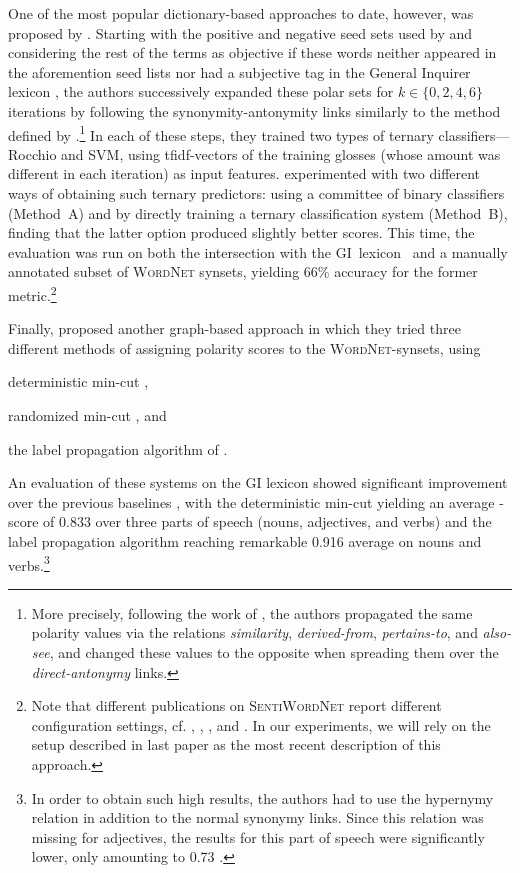 One of the most popular dictionary-based approaches to date, however,
was proposed by \citet{Esuli:06c}.  Starting with the positive and
negative seed sets used by \citet{Turney:03} and considering the rest
of the terms as objective if these words neither appeared in the
aforemention seed lists nor had a subjective tag in the General
Inquirer lexicon \cite{Stone:66}, the authors successively expanded
these polar sets for $k \in \{0, 2, 4, 6\}$ iterations by following
the synonymity-antonymity links similarly to the method defined by
\citet{Hu:04}.\footnote{More precisely, following the work of
  \citet{Strapparava:04}, the authors propagated the same polarity
  values via the relations \emph{similarity}, \emph{derived-from},
  \emph{pertains-to}, and \emph{also-see}, and changed these values to
  the opposite when spreading them over the \emph{direct-antonymy}
  links.}  In each of these steps, they trained two types of ternary
classifiers---Rocchio and SVM, using tfidf-vectors of the training
glosses (whose amount was different in each iteration) as input
features.  \citet{Esuli:06c} experimented with two different ways of
obtaining such ternary predictors: using a committee of binary
classifiers (Method~A) and by directly training a ternary
classification system (Method~B), finding that the latter option
produced slightly better scores.  This time, the evaluation was run on
both the intersection with the GI~lexicon~\cite{Stone:66} and a
manually annotated subset of \textsc{WordNet} synsets, yielding 66\%
accuracy for the former metric.\footnote{Note that different
  publications on \textsc{SentiWordNet} report different configuration
  settings, cf. \cite{Esuli:05}, \citet{Esuli:06a}, \citet{Esuli:06b},
  and \citet{Esuli:06c}.  In our experiments, we will rely on the
  setup described in last paper as the most recent description of this
  approach.}

Finally, \citet{Rao:09} proposed another graph-based approach in which
they tried three different methods of assigning polarity scores to the
\textsc{WordNet}-synsets, using
\begin{inparaenum}
\item deterministic min-cut \cite{Blum:01},
\item randomized min-cut \cite{Blum:04}, and
\item the label propagation algorithm of \citet{Zhu:02}.
\end{inparaenum}
An evaluation of these systems on the GI lexicon \cite{Stone:66}
showed significant improvement over the previous baselines
\cite{Kamps:04,Kim:06}, with the deterministic min-cut yielding an
average \F{}-score of 0.833 over three parts of speech (nouns,
adjectives, and verbs) and the label propagation algorithm reaching
remarkable 0.916 average \F{} on nouns and verbs.\footnote{In order to
  obtain such high results, the authors had to use the hypernymy
  relation in addition to the normal synonymy links.  Since this
  relation was missing for adjectives, the results for this part of
  speech were significantly lower, only amounting to 0.73 \F{}.}

